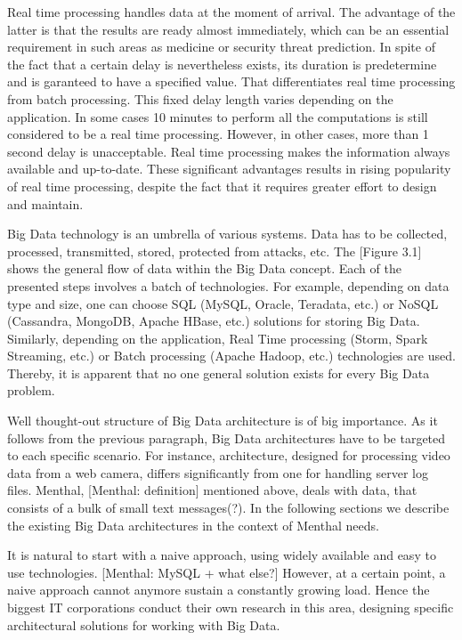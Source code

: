 Real time processing handles data at the moment of arrival. 
The advantage of the latter is that the results are ready almost immediately, which can be an essential requirement in such areas as medicine or security threat prediction. 
In spite of the fact that a certain delay is nevertheless exists, its duration is predetermine and is garanteed to have a specified value.
That differentiates real time processing from batch processing.
This fixed delay length varies depending on the application.
In some cases 10 minutes to perform all the computations is still considered to be a real time processing.
However, in other cases, more than 1 second delay is unacceptable.
Real time processing makes the information always available and up-to-date.
These significant advantages results in rising popularity of real time processing, despite the fact that it requires greater effort to design and maintain.

Big Data technology is an umbrella of various systems. 
Data has to be collected, processed, transmitted, stored, protected from attacks, etc.
The [Figure 3.1] shows the general flow of data within the Big Data concept.
Each of the presented steps involves a batch of technologies.
For example, depending on data type and size, one can choose SQL (MySQL, Oracle, Teradata, etc.) or NoSQL (Cassandra, MongoDB, Apache HBase, etc.) solutions for storing Big Data.
Similarly, depending on the application, Real Time processing (Storm, Spark Streaming, etc.) or Batch processing (Apache Hadoop, etc.) technologies are used. 
Thereby, it is apparent that no one general solution exists for every Big Data problem.

Well thought-out structure of Big Data architecture is of big importance.
As it follows from the previous paragraph, Big Data architectures have to be targeted to each specific scenario.
For instance, architecture, designed for processing video data from a web camera, differs significantly from one for handling server log files.
Menthal, [Menthal: definition] mentioned above, deals with data, that consists of a bulk of small text messages(?). 
In the following sections we describe the existing Big Data architectures in the context of Menthal needs.

It is natural to start with a naive approach, using widely available and easy to use technologies.
[Menthal: MySQL + what else?]
However, at a certain point, a naive approach cannot anymore sustain a constantly growing load.
Hence the biggest IT corporations conduct their own research in this area, designing specific architectural solutions for working with Big Data.

